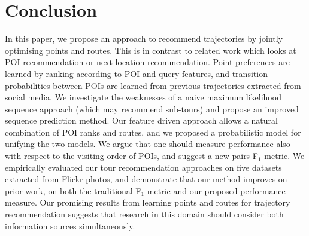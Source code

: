 \section{Conclusion}
\label{sec:conclusion}

In this paper, we propose an approach to recommend trajectories
by jointly optimising points and routes.
This is in contrast to related work which looks at
POI recommendation or next location recommendation.
Point preferences are learned by ranking according to POI and query features,
and transition probabilities between POIs are learned from previous trajectories extracted
from social media.
We investigate the weaknesses of a naive maximum likelihood sequence approach (which
may recommend sub-tours) and propose an improved sequence prediction method.
Our feature driven approach allows a natural combination of POI ranks and routes,
and we proposed a probabilistic model 
for unifying the two models.
We argue that one should measure performance also with respect to the visiting order of POIs, 
and suggest a new pairs-F$_1$ metric.
We empirically evaluated our tour recommendation approaches on five datasets extracted from
Flickr photos, and demonstrate that our method improves on prior work, on both the traditional
F$_1$ metric and our proposed performance measure.
Our promising results from learning points and routes for trajectory recommendation suggests
that research in this domain should consider both information sources simultaneously.
